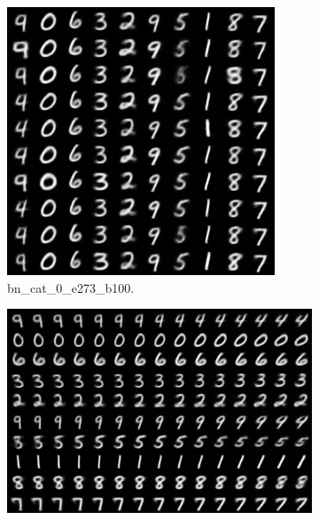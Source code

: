 \begin{figure}[!htbp]
   \centering
\begin{subfigure}[t]{0.48\textwidth}
   \includegraphics[width=\textwidth,center]{2019-04-24/compare_grad_mode/bn_cat_0_e273_b100.png}
   \caption{bn_cat_0_e273_b100.}
   \label{fig:.._.._notes_journal_figures_2019-04-24_compare_grad_mode-a}
\end{subfigure}
\begin{subfigure}[t]{0.48\textwidth}
   \includegraphics[width=\textwidth,center]{2019-04-24/compare_grad_mode/bn_info_0_e273_b100.png}

\end{subfigure}
\end{figure}
